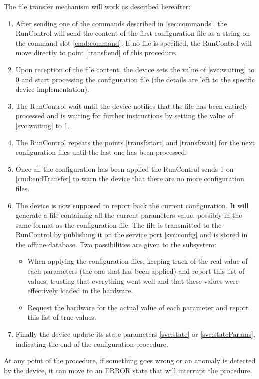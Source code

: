 \documentclass[a4paper]{article}
\begin{document}
The file transfer mechanism will work as described hereafter:
\begin{enumerate}
	\item \label{transf:start} After sending one of the commands described in \ref{sec:commands}, the
	RunControl will send the content of the first configuration file as a string on the command slot \ref{cmd:command}. If
	no file is specified, the RunControl will move directly to point \ref{transf:end} of this
	procedure.
	\item Upon reception of the file content, the device sets the value of \ref{svc:waiting} to 0 and
	start processing the configuration file (the details are left to the specific device
	implementation).
	\item \label{transf:wait} The RunControl wait until the device notifies that the file has been
	entirely processed and is waiting for further instructions by setting the value of
	\ref{svc:waiting} to 1.
	\item The RunControl repeats the points \ref{transf:start} and \ref{transf:wait} for the next
	configuration files until the last one has been processed.
	\item \label{transf:end} Once all the configuration has been applied the RunControl sends 1 on
	\ref{cmd:endTransfer} to warn the device that there are no more configuration files.
	\item The device is now supposed to report back the current configuration. It will generate a file
	containing all the current parameters value, possibly in the same format as the configuration
	file. The file is transmitted to the RunControl by publishing it on the service port
	\ref{svc:config} and is stored in the offline database. Two possibilities are given to the
	subsystem:
	\begin{itemize}
		\item When applying the configuration files, keeping track of the real value of each parameters
		(the one that has been applied) and report this list of values, trusting that everything went
		well and that these values were effectively loaded in the hardware.
		\item Request the hardware for the actual value of each parameter and report this list of true
		values.
	\end{itemize}
	\item Finally the device update its state parameters \ref{svc:state} or \ref{svc:stateParams},
	indicating the end of the configuration procedure. 
\end{enumerate}
At any point of the procedure, if something goes wrong or an anomaly is detected by the device, it
can move to an ERROR state that will interrupt the procedure. 
\end{document}
